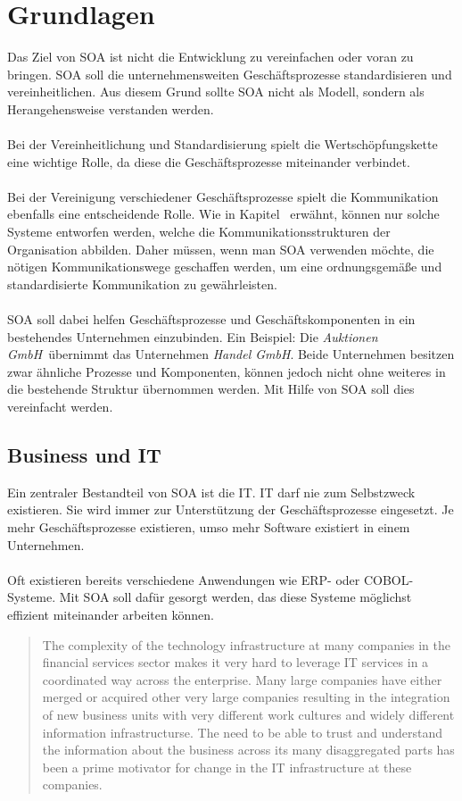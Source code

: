 \section{Grundlagen}
\label{sec:Grundlagen}
Das Ziel von SOA ist nicht die Entwicklung zu vereinfachen oder voran zu bringen. SOA soll die unternehmensweiten Geschäftsprozesse standardisieren und vereinheitlichen. Aus diesem Grund sollte SOA nicht als Modell, sondern als Herangehensweise verstanden werden.
\\\\
Bei der Vereinheitlichung und Standardisierung spielt die Wertschöpfungskette eine wichtige Rolle, da diese die Geschäftsprozesse miteinander verbindet.
\\\\
Bei der Vereinigung verschiedener Geschäftsprozesse spielt die Kommunikation ebenfalls eine entscheidende Rolle. Wie in Kapitel \ erwähnt, können nur solche Systeme entworfen werden, welche die Kommunikationsstrukturen der Organisation abbilden. Daher müssen, wenn man SOA verwenden möchte, die nötigen Kommunikationswege geschaffen werden, um eine ordnungsgemäße und standardisierte Kommunikation zu gewährleisten.
\\\\
SOA soll dabei helfen Geschäftsprozesse und Geschäftskomponenten in ein bestehendes Unternehmen einzubinden. Ein Beispiel: Die \textit{Auktionen GmbH}\ übernimmt das Unternehmen \textit{Handel GmbH}. Beide Unternehmen besitzen zwar ähnliche Prozesse und Komponenten, können jedoch nicht ohne weiteres in die bestehende Struktur übernommen werden. Mit Hilfe von SOA soll dies vereinfacht werden.

\subsection{Business und IT}
\label{subsec:BusinessAndIT}
Ein zentraler Bestandteil von SOA ist die IT. IT darf nie zum Selbstzweck existieren. Sie wird immer zur Unterstützung der Geschäftsprozesse eingesetzt. Je mehr Geschäftsprozesse existieren, umso mehr Software existiert in einem Unternehmen.
\\\\
Oft existieren bereits verschiedene Anwendungen wie ERP- oder COBOL-Systeme. Mit SOA soll dafür gesorgt werden, das diese Systeme möglichst effizient miteinander arbeiten können.
\begin{quotation}
    \frqq The complexity of the technology infrastructure at many companies in the financial services sector makes it very hard to leverage IT services in a coordinated way across the enterprise. Many large companies have either merged or acquired other very large companies resulting in the integration of new business units with very different work cultures and widely different information infrastructurse. The need to be able to trust and understand the information about the business across its many disaggregated parts has been a prime motivator for change in the IT infrastructure at these companies.\flqq \cite[S. 17]{SOAForDummies}
\end{quotation}

